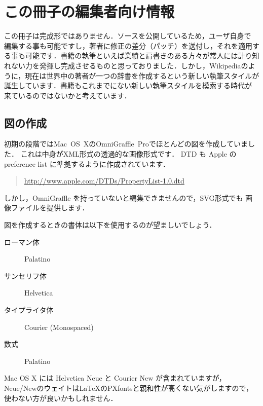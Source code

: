 \chapter{この冊子の編集者向け情報}%

この冊子は完成形ではありません．ソースを公開しているため，ユーザ自身で
編集する事も可能ですし，著者に修正の差分（パッチ）を送付し，それを適用す
る事も可能です．書籍の執筆といえば業績と肩書きのある方々が常人には計り知
れない力を発揮し完成させるものと思っておりました．しかし，Wikipediaのよ
うに，現在は世界中の著者が一つの辞書を作成するという新しい執筆スタイルが
誕生しています．書籍もこれまでにない新しい執筆スタイルを模索する時代が
来ているのではないかと考えています．

\section{図の作成}
初期の段階ではMac~OS~XのOmniGraffle~Proでほとんどの図を作成していました．
これは中身がXML形式の透過的な画像形式です．
DTD も Apple の preference list に準拠するように作成されています．
\begin{quote}
   \url{http://www.apple.com/DTDs/PropertyList-1.0.dtd}
\end{quote}
しかし，OmniGraffle を持っていないと編集できませんので，SVG形式でも
画像ファイルを提供します．

図を作成するときの書体は以下を使用するのが望ましいでしょう．
\begin{description}
 \item[ローマン体]    
   Palatino
 \item[サンセリフ体]
   Helvetica
 \item[タイプライタ体]
   Courier (Monospaced)
 \item[数式]
  Palatino
\end{description}
Mac OS X には Helvetica Neue と Courier New が含まれていますが，
Neue/Newのウェイトは\LaTeX のPXfontsと親和性が高くない気がしますので，
使わない方が良いかもしれません．



